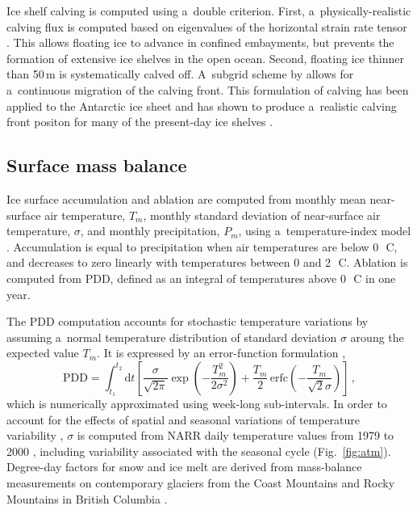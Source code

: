 \documentclass[tc, manuscript]{copernicus}
\begin{document}
      Ice shelf calving is computed using a~double criterion. First,
      a~physically-realistic calving flux is computed based on eigenvalues of
      the horizontal strain rate tensor \citep{Winkelmann.etal.2011,
      Levermann.etal.2012}. This allows floating ice to advance in confined
      embayments, but prevents the formation of extensive ice shelves in the
      open ocean. Second, floating ice thinner than 50\,\unit{m} is
      systematically calved off. A~subgrid scheme by
      \citet{Albrecht.etal.2011} allows for a~continuous migration of the
      calving front. This formulation of calving has been applied to the
      Antarctic ice sheet and has shown to produce a~realistic calving front
      positon for many of the present-day ice shelves
      \citep{Martin.etal.2011}.

\subsection{Surface mass balance}
\label{sec:surface}

      Ice surface accumulation and ablation are computed from monthly mean
      near-surface air temperature, $T_m$, monthly standard deviation of
      near-surface air temperature, $\sigma$, and monthly precipitation,
      $P_m$, using a~temperature-index model \citep[e.g.,][]{Hock.2003}.
      Accumulation is equal to precipitation when air temperatures are below
      0\,\unit{{\degree}C}, and decreases to zero linearly with temperatures
      between 0 and 2\,\unit{{\degree}C}. Ablation is computed from PDD,
      defined as an integral of temperatures above 0\,\unit{{\degree}C} in
      one year.

      The PDD computation accounts for stochastic temperature variations by
      assuming a~normal temperature distribution of standard deviation
      $\sigma$ aroung the expected value $T_m$. It is expressed by an
      error-function formulation \citep{Calov.Greve.2005},
\begin{equation}
    \label{eqn:calovgreve}
    \mathrm{PDD} = \int_{t_1}^{t_2} \mathrm{d}t
        \left[\frac{\sigma}{\sqrt{2\pi}}
                \exp\left({-\frac{T_{m}^2}{2\sigma^2}}\right)
              + \frac{T_{m}}{2} \, \mathrm{erfc}
                \left(-\frac{T_{m}}{\sqrt{2}\sigma}\right)\right] \,,
\end{equation}
      which is numerically approximated using week-long sub-intervals. In
      order to account for the effects of spatial and seasonal variations of
      temperature variability \citep{Seguinot.2013}, $\sigma$ is computed
      from NARR daily temperature values from 1979 to 2000
      \citep{Mesinger.etal.2006}, including variability associated with the
      seasonal cycle (Fig.~\ref{fig:atm}). Degree-day factors for snow and
      ice melt are derived from mass-balance measurements on contemporary
      glaciers from the Coast Mountains and Rocky Mountains in British
      Columbia \citep[Table~\ref{tab:params};][]{Shea.etal.2009}.
\end{document}
